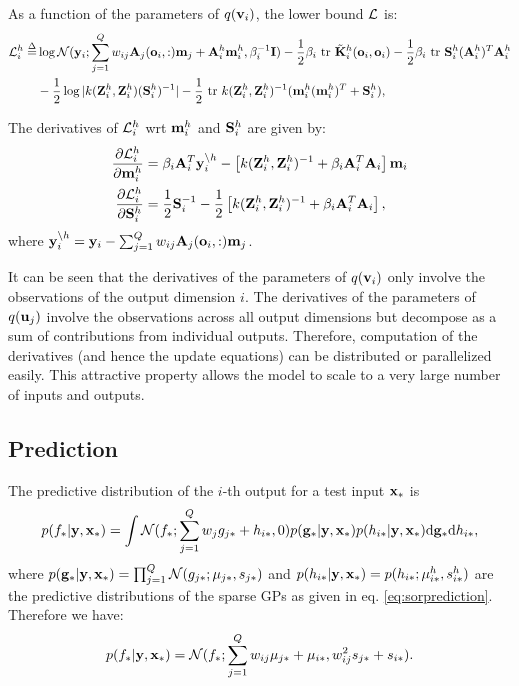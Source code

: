 \documentclass{article} %
\begin{document}
\newcommand{\Lhi}{\calL^h_i}
\noindent As a function of the parameters of $q(\mathbf{v}_i)$, the lower bound $\mathcal{L}$ is:
\begin{align}
\nonumber
\Lhi \define&
 \log \Normal(\y_i; \sum_{j=1}^Q w_{ij} \A_j(\oi,:) \m_j + \Ahi \mhi, \beta_i^{-1} \I)
 - \frac{1}{2} \beta_i \trace \tilde{\K}^h_i(\oi,\oi)
 - \frac{1}{2} \beta_i \trace \Shi (\Ahi)^T \Ahi
 \\
  &- \frac{1}{2} \log |k(\Zhi,\Zhi) (\Shi)^{-1}| -\frac{1}{2} \trace k(\Zhi,\Zhi)^{-1} (\mhi (\mhi)^T + \Shi) ,
\end{align}

\noindent The derivatives of $\Lhi$ wrt $\mathbf{m}^h_i$ and $\mathbf{S}^h_i$ are given by:
\newcommand{\ynoh}{\y_i^{\backslash h}}
\begin{align}
\deriv{\Lhi}{\mhi}
& = \beta_i \A_i^T \ynoh - \left[k(\Zhi,\Zhi)^{-1} +  \beta_i \A_i^T \A_i \right] \m_i \\
\deriv{\Lhi}{\Shi} 
&= \frac{1}{2} \S_i^{-1} - \frac{1}{2} \left[ k(\Zhi,\Zhi)^{-1} + \beta_i \A_i^T \A_i \right] ,
\end{align}
where $\ynoh = \y_i - \sum_{j=1}^Q w_{ij} \A_j(\oi,:) \m_j$.

\noindent It can be seen that the derivatives of the parameters of $q(\mathbf{v}_i)$ only involve the observations of the output dimension $i$.
The derivatives of the parameters of $q(\mathbf{u}_j)$ involve the observations across all output dimensions but decompose as a sum of contributions from individual outputs.
Therefore, computation of the derivatives (and hence the update equations) can be distributed or parallelized easily.
This attractive property allows the model to scale to a very large number of inputs and outputs.


\subsection{Prediction}
The predictive distribution of the $i$-th output for a test input $\mathbf{x}_*$ is 
\begin{align}
p(f_* | \mathbf{y}, \mathbf{x}_*) = \int \mathcal{N}(f_*; \sum_{j=1}^Q w_j g_{j*} + h_{i*}, 0) p(\mathbf{g}_* | \mathbf{y}, \mathbf{x}_*) p(h_{i*} | \mathbf{y}, \mathbf{x}_*) \mathrm{d} \mathbf{g}_* \mathrm{d} h_{i*},
\end{align}
where $p(\mathbf{g}_* | \mathbf{y}, \mathbf{x}_*) = \prod_{j=1}^Q \mathcal{N}(g_{j*}; \mu_{j*}, s_{j*})$ and $p(h_{i*} | \mathbf{y}, \mathbf{x}_*) = p(h_{i*}; \mu^h_{i*}, s^h_{i*})$ are the predictive distributions of the sparse GPs as given in eq. \ref{eq:sorprediction}.
Therefore we have:
\begin{align}
p(f_* | \mathbf{y}, \mathbf{x}_*) = \mathcal{N}(f_*; \sum_{j=1}^Q w_{ij} \mu_{j*} + \mu_{i*}, w_{ij}^2 s_{j*} + s_{i*}). 
\end{align}
\end{document}
